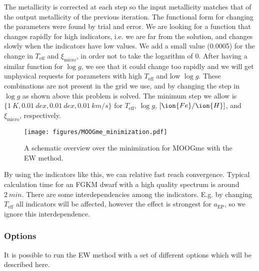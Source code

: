 \documentclass{aa}
\begin{document}
The metallicity is corrected at each step so the input metallicity matches
that of the output metallicity of the previous iteration. The functional
form for changing the parameters were found by trial and error. We are looking
for a function that changes rapidly for high indicators, i.e. we are far from
the solution, and changes slowly when the indicators have low values. We add
a small value (0.0005) for the change in $T_\mathrm{eff}$ and $\xi_\mathrm{micro}$,
in order not to take the logarithm of 0. After having a similar
function for $\log g$, we see that it could change too rapidly and we will
get unphysical requests for parameters with high $T_\mathrm{eff}$ and low
$\log g$. These combinations are not present in the grid we use, and by
changing the step in $\log g$ as shown above this problem is solved. The
minimum step we allow is $\{\SI{1}{K}, \SI{0.01}{dex}, \SI{0.01}{dex},
\SI{0.01}{km/s}\}$ for $T_\mathrm{eff}$, $\log g$, $[\ion{Fe}/\ion{H}]$, and
$\xi_\mathrm{micro}$, respectively.

\begin{figure}[tpb]
    \centering
    \texttt{[image: figures/MOOGme\_minimization.pdf]}
    \caption{A schematic overview over the minimization for MOOGme with the
    EW method.}
    \label{fig:MOOGme_minimization}
\end{figure}

By using the indicators like this, we can relative fast reach convergence.
Typical calculation time for an FGKM dwarf with a high quality spectrum
is around $\SI{2}{min}$.
There are some interdependencies among the indicators. E.g. by changing
$T_\mathrm{eff}$ all indicators will be affected, however the effect is
strongest for $a_\mathrm{EP}$, so we ignore this interdependence.

\subsubsection{Options}
\label{subs:EWoptions}
It is possible to run the EW method with a set of different options which
will be described here.
\end{document}
